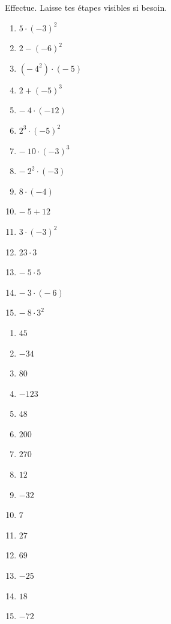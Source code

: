 \documentclass[../../syllabus_1.tex]{subfiles}
\begin{document}
\newpage
\begin{exercise}
    Effectue. Laisse tes étapes visibles si besoin.
    \begin{enumerate}[itemsep=.3cm, cols=3]
        \item \(5 \cdot ( - 3)^{2} \)
        \item \(2 - ( - 6)^{2} \)
        \item \((- \ 4^{2}) \cdot (- \ 5) \)
        \item \(2 + ( - 5)^{3} \)
        \item \(- \ 4 \cdot ( - 12) \)
        \item \(2^{3} \cdot ( - 5)^{2} \)
        \item \(- \ 10 \cdot ( - 3)^{3} \)
        \item \(- \ 2^{2} \cdot ( - 3) \)
        \item \( 8 \cdot ( - 4) \)
        \item \(- \ 5 + 12 \)
        \item \(3 \cdot ( - 3)^{2} \)
        \item \(23 \cdot 3 \)
        \item \(- \ 5 \cdot 5 \)
        \item \(- \ 3 \cdot (- \ 6) \)
        \item \(- \ 8 \cdot 3^2 \)
    \end{enumerate}
\end{exercise}
\begin{solution}
    \begin{enumerate}[cols=4]
        \item \(45\)
        \item \(-34\)
        \item \(80\)
        \item \(-123\)
        \item \(48\)
        \item \(200\)
        \item \(270\)
        \item \(12\)
        \item \(-32\)
        \item \(7\)
        \item \(27\)
        \item \(69\)
        \item \(-25\)
        \item \(18\)
        \item \(-72\)
    \end{enumerate}
\end{solution}
\end{document}
